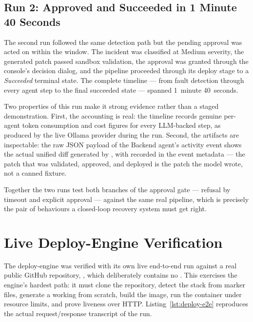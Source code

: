 \subsection{Run 2: Approved and Succeeded in 1 Minute 40 Seconds}

The second run followed the same detection path but the pending approval
was acted on within the window. The incident was classified at Medium
severity, the generated patch passed sandbox validation, the approval was
granted through the console's decision dialog, and the pipeline proceeded
through its deploy stage to a \emph{Succeeded} terminal state. The complete
timeline --- from fault detection through every agent step to the final
succeeded state --- spanned 1~minute 40~seconds.

Two properties of this run make it strong evidence rather than a staged
demonstration. First, the accounting is real: the timeline records genuine
per-agent token consumption and cost figures for every LLM-backed step, as
produced by the live Ollama provider during the run. Second, the artifacts
are inspectable: the raw JSON payload of the Backend agent's activity event
shows the actual unified diff generated by , with
 recorded in the event metadata --- the patch that
was validated, approved, and deployed is the patch the model wrote, not a
canned fixture.

Together the two runs test both branches of the approval gate --- refusal
by timeout and explicit approval --- against the same real pipeline, which
is precisely the pair of behaviours a closed-loop recovery system must get
right.

\section{Live Deploy-Engine Verification}

The deploy-engine was verified with its own live end-to-end run against a
real public GitHub repository, , which
deliberately contains no . This exercises the engine's
hardest path: it must clone the repository, detect the stack from marker
files, generate a working  from scratch, build the image,
run the container under resource limits, and prove liveness over HTTP.
Listing~\ref{lst:deploy-e2e} reproduces the actual request/response
transcript of the run.

